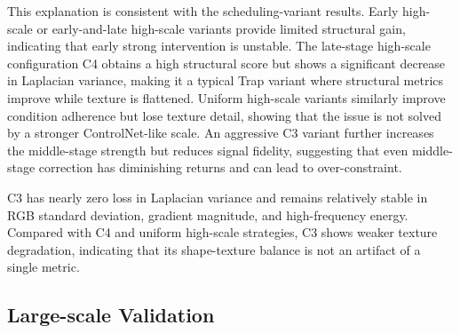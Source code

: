 \documentclass[times,twocolumn,final]{elsarticle}
\begin{document}
This explanation is consistent with the scheduling-variant results. Early high-scale or early-and-late high-scale variants provide limited structural gain, indicating that early strong intervention is unstable. The late-stage high-scale configuration C4 obtains a high structural score but shows a significant decrease in Laplacian variance, making it a typical Trap variant where structural metrics improve while texture is flattened. Uniform high-scale variants similarly improve condition adherence but lose texture detail, showing that the issue is not solved by a stronger ControlNet-like scale. An aggressive C3 variant further increases the middle-stage strength but reduces signal fidelity, suggesting that even middle-stage correction has diminishing returns and can lead to over-constraint.

\FloatBarrier

\begin{table}[h!]
\centering
\caption{Comparison of representative variants under extended texture metrics. All delta texture metrics are computed relative to the corresponding ground-truth foreground renderings under the same views and masks. This table verifies that the advantage of C3 is not due to a single Laplacian variance metric.}
\label{tab:extended}
\end{table}

C3 has nearly zero loss in Laplacian variance and remains relatively stable in RGB standard deviation, gradient magnitude, and high-frequency energy. Compared with C4 and uniform high-scale strategies, C3 shows weaker texture degradation, indicating that its shape-texture balance is not an artifact of a single metric.

\FloatBarrier

\subsection{Large-scale Validation}
\label{subsec:largescale}
\end{document}
